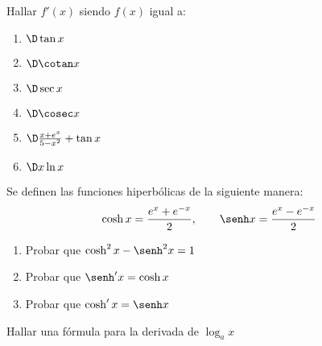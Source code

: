 \item Hallar $f'(x)$ siendo $f(x)$ igual a:
\begin{multicols}{2}
\begin{enumerate}
    \item $\D \tan x$
    \item $\D \cotan x$
    \item $\D \sec x$
    \item $\D \cosec x$
    \item $\D \frac{x+e^x}{5-x^2}+\tan x$
    \item $\D x \ln x$
\end{enumerate}
\end{multicols}

\item Se definen las funciones hiperbólicas de la siguiente manera:
\[
\cosh x = \frac{e^x+e^{-x}}{2},
\qquad
\senh x = \frac{e^x-e^{-x}}{2}
\]
\begin{enumerate}
    \item Probar que $\cosh^2 x-\senh^2 x = 1$
    \item Probar que $\senh' x = \cosh x$
    \item Probar que $\cosh' x = \senh x$
\end{enumerate}

\item Hallar una fórmula para la derivada de $\log_a x$
